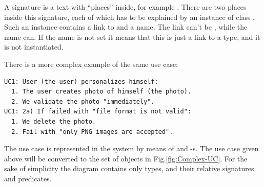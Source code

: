 \documentclass[12pt,oneside,letterpaper]{article}
\begin{document}
        A signature is a text with ``places'' inside, for example
        . There are two places inside
        this signature, each of which has to be explained by an
        instance of class . Such an instance contains
        a link to  and a name. The link can't be ,
        while the name can. If the name is not set it means that this is just
        a link to a type, and it is not instantiated.

        There is a more complex example of the same use case:

\begin{lstlisting}
UC1: User (the user) personalizes himself:
  1. The user creates photo of himself (the photo).
  2. We validate the photo "immediately".
UC1: 2a) If failed with "file format is not valid":
  1. We delete the photo.
  2. Fail with "only PNG images are accepted".
\end{lstlisting}

        The use case is represented in the system by means of
         and -s. The
        use case given above will be converted to the set
        of objects in Fig.\ref{fig:Complex-UC}. For the sake of
        simplicity the diagram contains only  types, and
        their relative signatures and predicates.
\end{document}
